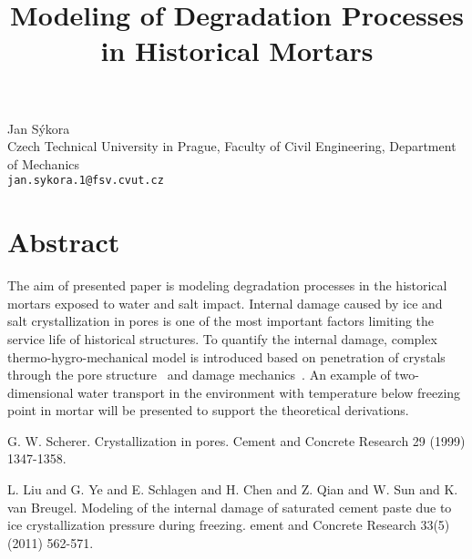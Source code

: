 \title{Modeling of Degradation Processes in Historical Mortars}
 \author{} \institute{}
\maketitle
\begin{center}
{\large Jan S\'{y}kora}\\
Czech Technical University in Prague, Faculty of Civil Engineering, Department of Mechanics\\
{\tt jan.sykora.1@fsv.cvut.cz}

\end{center}

\section*{Abstract}

The aim of presented paper is modeling degradation processes in
the historical mortars exposed to water and salt impact. Internal
damage caused by ice and salt crystallization in pores is one of
the most important factors limiting the service life of historical
structures. To quantify the internal damage, complex
thermo-hygro-mechanical model is introduced based on penetration
of crystals through the pore structure~\cite{Scherer} and damage mechanics~\cite{Liu}. An example of two-dimensional water transport in the
environment with temperature below freezing point in mortar will
be presented to support the theoretical derivations.


\begin{thebibliography}{10}

{\sc G. W. Scherer}. {Crystallization in pores}. Cement and Concrete Research 29 (1999) 1347-1358.



{\sc L. Liu and G. Ye and E. Schlagen and H. Chen and Z. Qian and W. Sun and K. van Breugel}. {Modeling of the internal damage of saturated cement paste due to ice crystallization pressure during freezing}. ement and Concrete Research 33(5)  (2011) 562-571.

\end{thebibliography}
